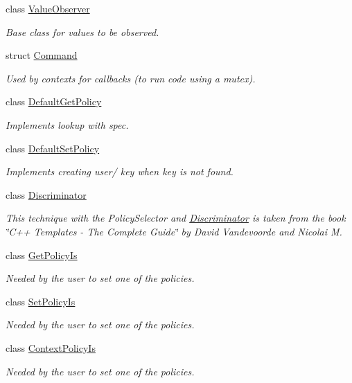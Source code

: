 \begin{DoxyCompactItemize}
class \hyperlink{classkdb_1_1ValueObserver}{Value\-Observer}
\begin{DoxyCompactList}\small\item\em Base class for values to be observed. \end{DoxyCompactList}\item 
struct \hyperlink{structkdb_1_1Command}{Command}
\begin{DoxyCompactList}\small\item\em Used by contexts for callbacks (to run code using a mutex). \end{DoxyCompactList}\item 
class \hyperlink{classkdb_1_1DefaultGetPolicy}{Default\-Get\-Policy}
\begin{DoxyCompactList}\small\item\em Implements lookup with spec. \end{DoxyCompactList}\item 
class \hyperlink{classkdb_1_1DefaultSetPolicy}{Default\-Set\-Policy}
\begin{DoxyCompactList}\small\item\em Implements creating user/ key when key is not found. \end{DoxyCompactList}\item 
class \hyperlink{classkdb_1_1Discriminator}{Discriminator}
\begin{DoxyCompactList}\small\item\em This technique with the Policy\-Selector and \hyperlink{classkdb_1_1Discriminator}{Discriminator} is taken from the book \char`\"{}\-C++ Templates -\/ The Complete Guide\char`\"{} by David Vandevoorde and Nicolai M. \end{DoxyCompactList}\item 
class \hyperlink{classkdb_1_1GetPolicyIs}{Get\-Policy\-Is}
\begin{DoxyCompactList}\small\item\em Needed by the user to set one of the policies. \end{DoxyCompactList}\item 
class \hyperlink{classkdb_1_1SetPolicyIs}{Set\-Policy\-Is}
\begin{DoxyCompactList}\small\item\em Needed by the user to set one of the policies. \end{DoxyCompactList}\item 
class \hyperlink{classkdb_1_1ContextPolicyIs}{Context\-Policy\-Is}
\begin{DoxyCompactList}\small\item\em Needed by the user to set one of the policies. \end{DoxyCompactList}\item 

\end{DoxyCompactItemize}
